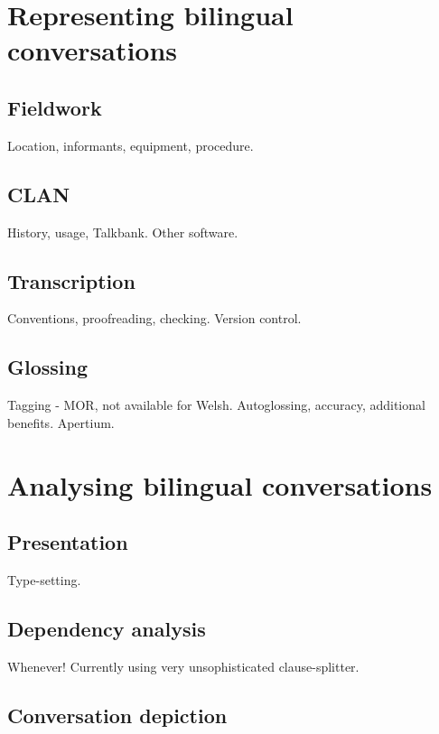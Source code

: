 \documentclass[a4paper, twocolumn, 11pt, twoside]{article}
\begin{document}
\section{Representing bilingual conversations}

\subsection{Fieldwork}

Location, informants, equipment, procedure.

\subsection{CLAN}

History, usage, Talkbank.
Other software.

\subsection{Transcription}

Conventions, proofreading, checking.
Version control.

\subsection{Glossing}

Tagging - MOR, not available for Welsh.
Autoglossing, accuracy, additional benefits.
Apertium.


\section{Analysing bilingual conversations}

\subsection{Presentation}

Type-setting.

\subsection{Dependency analysis}

Whenever!  Currently using very unsophisticated clause-splitter.

\subsection{Conversation depiction}
\end{document}
